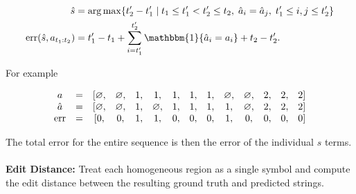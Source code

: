 \documentclass[12pt]{report}
\newcommand{\p}[0]{\prime}
\newcommand{\err}[0]{\text{\textnormal{err}}}
\newcommand{\1}[0]{\mathbbm{1}}
\newcommand{\seq}[3]{\ensuremath{#1_{{#2}:{#3}}}}
\begin{document}
\begin{align*}
    \hat{s} &=  
    \arg\max\{t_2^\p - t_1^\p \mid t_1 \le t_1^\p < t_2^\p \le t_2,\; \hat{a}_i = \hat{a}_j,\; t_1^\p \le i,j \le t_2^\p\} \\
    \err(\hat{s}, \seq{a}{t_1}{t_2}) &= t_1^\p - t_1 + \sum_{i=t_1^\p}^{t_2^\p} \1\{\hat{a}_i = a_i\} + t_2 - t_2^\p.
\end{align*}

For example

\[\begin{array}{c c c c c c c c c c c c c c}
    a       &=& [\varnothing,& \varnothing,& 1,& 1,          & 1,& 1,& 1,& \varnothing,& \varnothing,& 2,& 2,& 2] \\
    \hat{a} &=& [\varnothing,& \varnothing,& 1,& \varnothing,& 1,& 1,& 1,& 1,          & \varnothing,& 2,& 2,& 2] \\
    \err    &=& [0,          & 0,          & 1,& 1,          & 0,& 0,& 0,& 1,          & 0,          & 0,& 0,& 0] \\
\end{array}\]

The total error for the entire sequence is then the error of the individual $s$ terms.
\\\\
\textbf{Edit Distance:} Treat each homogeneous region as a single symbol and compute the edit
distance between the resulting ground truth and predicted strings.

\begin{acronym}
\end{acronym}



\end{document}

